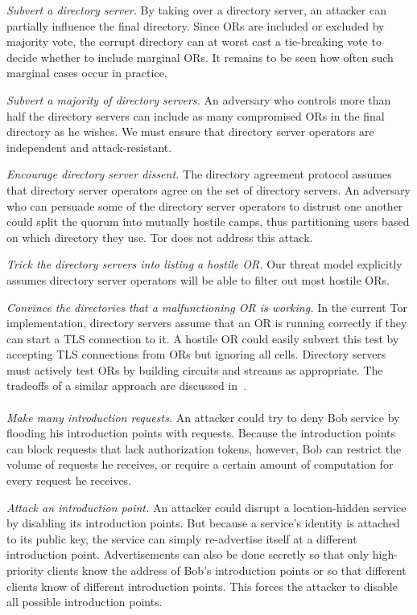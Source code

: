 \documentclass[twocolumn]{article}
\begin{document}
\emph{Subvert a directory server.}  By taking over a directory server,
an attacker can partially influence the final directory.  Since ORs
are included or excluded by majority vote, the corrupt directory can
at worst cast a tie-breaking vote to decide whether to include
marginal ORs.  It remains to be seen how often such marginal cases
occur in practice.

\emph{Subvert a majority of directory servers.} An adversary who controls
more than half the directory servers can include as many compromised
ORs in the final directory as he wishes. We must ensure that directory
server operators are independent and attack-resistant.

\emph{Encourage directory server dissent.}  The directory
agreement protocol assumes that directory server operators agree on
the set of directory servers.  An adversary who can persuade some
of the directory server operators to distrust one another could
split the quorum into mutually hostile camps, thus partitioning
users based on which directory they use.  Tor does not address
this attack.

\emph{Trick the directory servers into listing a hostile OR.}
Our threat model explicitly assumes directory server operators will
be able to filter out most hostile ORs.

\emph{Convince the directories that a malfunctioning OR is
working.}  In the current Tor implementation, directory servers
assume that an OR is running correctly if they can start a TLS
connection to it.  A hostile OR could easily subvert this test by
accepting TLS connections from ORs but ignoring all cells. Directory
servers must actively test ORs by building circuits and streams as
appropriate.  The tradeoffs of a similar approach are discussed
in~\cite{mix-acc}.\\

\\
\emph{Make many introduction requests.}  An attacker could
try to deny Bob service by flooding his introduction points with
requests.  Because the introduction points can block requests that
lack authorization tokens, however, Bob can restrict the volume of
requests he receives, or require a certain amount of computation for
every request he receives.

\emph{Attack an introduction point.} An attacker could
disrupt a location-hidden service by disabling its introduction
points.  But because a service's identity is attached to its public
key, the service can simply re-advertise
itself at a different introduction point. Advertisements can also be
done secretly so that only high-priority clients know the address of
Bob's introduction points or so that different clients know of different
introduction points. This forces the attacker to disable all possible
introduction points.
\end{document}
